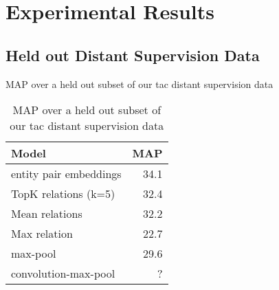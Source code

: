 \section{Experimental Results\label{sec:results}}


\subsection {Held out Distant Supervision Data}
MAP over a held out subset of our tac distant supervision data


%

\begin{table}[h!]
\setlength{\tabcolsep}{4.1pt}
\begin{center}
\begin{tabular}{|lr|}
\hline
\bf Model & MAP \\
\hline\hline
entity pair embeddings      & 34.1 \\
TopK relations (k=5)       & 32.4  \\
Mean relations              & 32.2 \\
Max relation                & 22.7  \\
\hline\hline
max-pool                    & 29.6 \\
convolution-max-pool        & ? \\
\hline

\hline
\end{tabular}
\caption{MAP over a held out subset of our tac distant supervision data
\label{distant-supervision-table}}
\end{center}
\vspace{-.3cm}
\end{table}


